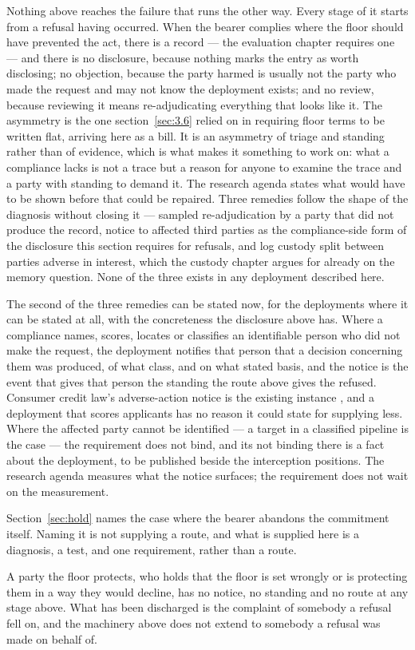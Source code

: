 
Nothing above reaches the failure that runs the other way. Every stage of it starts from a refusal having occurred. When the bearer complies where the floor should have prevented the act, there is a record — the evaluation chapter requires one — and there is no disclosure, because nothing marks the entry as worth disclosing; no objection, because the party harmed is usually not the party who made the request and may not know the deployment exists; and no review, because reviewing it means re-adjudicating everything that looks like it. The asymmetry is the one section~\ref{sec:3.6} relied on in requiring floor terms to be written flat, arriving here as a bill. It is an asymmetry of triage and standing rather than of evidence, which is what makes it something to work on: what a compliance lacks is not a trace but a reason for anyone to examine the trace and a party with standing to demand it. The research agenda states what would have to be shown before that could
be repaired. Three remedies follow the shape of the diagnosis without closing it — sampled re-adjudication by a party that did not produce the record, notice to affected third parties as the compliance-side form of the disclosure this section requires for refusals, and log custody split between parties adverse in interest, which the custody chapter argues for already on the memory question. None of the three exists in any deployment described here.

The second of the three remedies can be stated now, for the deployments where it can be stated at all, with the concreteness the disclosure above has. Where a compliance names, scores, locates or classifies an identifiable person who did not make the request, the deployment notifies that person that a decision concerning them was produced, of what class, and on what stated basis, and the notice is the event that gives that person the standing the route above gives the refused. Consumer credit law's adverse-action notice is the existing instance \autocite{usa1974ecoa}, and a deployment that scores applicants has no reason it could state for supplying less. Where the affected party cannot be identified — a target in a classified pipeline is the case — the requirement does not bind, and its not binding there is a fact about the deployment, to be published beside the interception positions. The research agenda measures what the notice surfaces; the requirement does not wait on the measurement.

Section~\ref{sec:hold} names the case where the bearer abandons the commitment itself. Naming it is not supplying a route, and what is supplied here is a diagnosis, a test, and one requirement, rather than a route.

A party the floor protects, who holds that the floor is set wrongly or is protecting them in a way they would decline, has no notice, no standing and no route at any stage above. What has been discharged is the complaint of somebody a refusal fell on, and the machinery above does not extend to somebody a refusal was made on behalf of.
